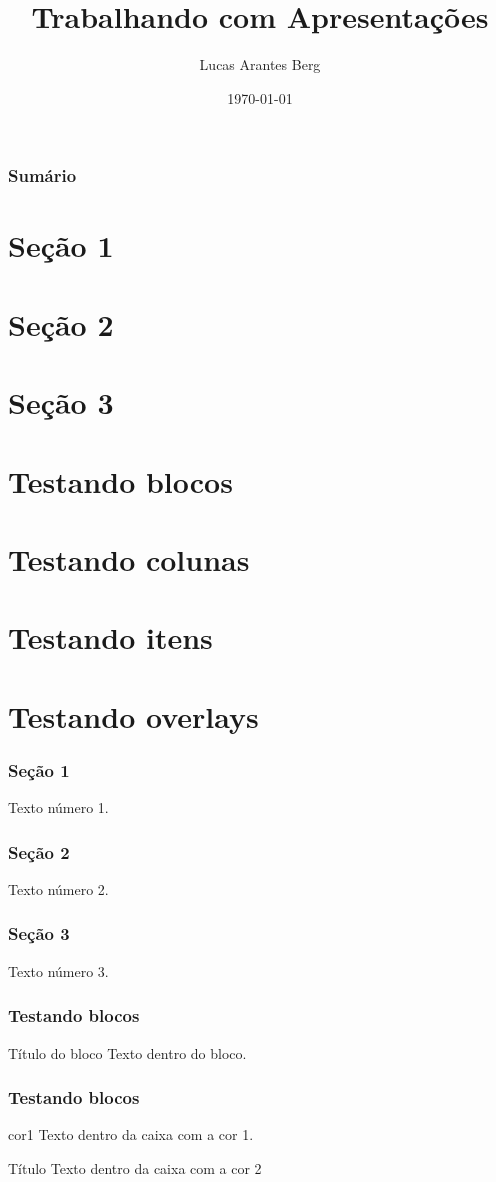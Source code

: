 \documentclass{beamer}
\title{Trabalhando com Apresentações}
\author[L. A. B.]{Lucas Arantes Berg}
\institute{Universidade Federal de Juiz de Fora}
\date{\today}
\begin{document}
	\begin{frame}
		\titlepage
	\end{frame}
	
	\begin{frame}
		\frametitle{Sumário}
		\section{Seção 1}
		\section{Seção 2}
		\section{Seção 3}
		\section{Testando blocos}
		\section{Testando colunas}
		\section{Testando itens}
		\section{Testando overlays}
	\end{frame}
	
	\begin{frame}
		\frametitle{Seção 1}
		Texto número 1.
	\end{frame}
	
	\begin{frame}
		\frametitle{Seção 2}
		Texto número 2.
	\end{frame}
	
	\begin{frame}
		\frametitle{Seção 3}
		Texto número 3.
	\end{frame}
	
	\begin{frame}
		\frametitle{Testando blocos}
		\begin{block}{Título do bloco}
			Texto dentro do bloco.
		\end{block}
	\end{frame}
	
	\begin{frame}
		\frametitle{Testando blocos}
		\begin{beamercolorbox}[shadow=true,rounded=true]{cor1}
			Texto dentro da caixa com a cor 1.
		\end{beamercolorbox}
		\begin{beamerboxesrounded}[lower=cor2,upper=cor1,shadow=true]{Título}
			Texto dentro da caixa com a cor 2
		\end{beamerboxesrounded}	
	\end{frame}
	
\end{document}
